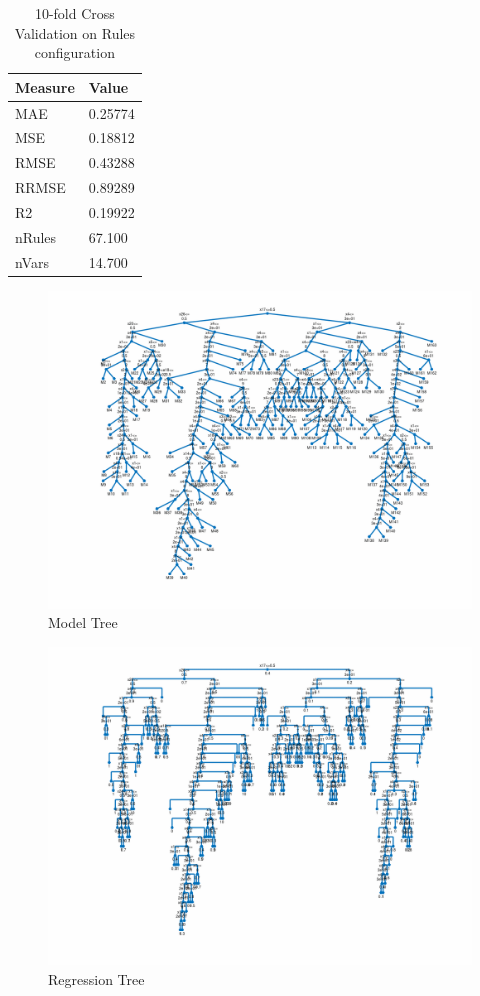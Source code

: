 \documentclass{article}
\begin{document}
\begin{table}[H]
	\centering
	\caption{10-fold Cross Validation on Rules configuration}
	\label{tab:CV-Rules}
	\begin{tabular}{|l|l|}
		\hline
		\textbf{Measure} 	& \textbf{Value} \\ \hline
		MAE       			& 0.25774 		 \\ \hline
		MSE       			& 0.18812 		 \\ \hline
		RMSE       			& 0.43288		 \\ \hline
		RRMSE       		& 0.89289 	  	 \\ \hline
		R2       			& 0.19922  	 	 \\ \hline
		nRules       		& 67.100   		 \\ \hline
		nVars       		& 14.700   		 \\ \hline
	\end{tabular}
\end{table}
\newpage
\vfill
\begin{figure}
	\includegraphics[width=\textwidth,height=\textheight,keepaspectratio]{model_tree.png}
	\caption{Model Tree}
\end{figure}	
\begin{figure}
	\centering
	\includegraphics[width=\textwidth,height=\textheight,keepaspectratio]{regression_tree.png}
	\caption{Regression Tree}
\end{figure}
\end{document}
